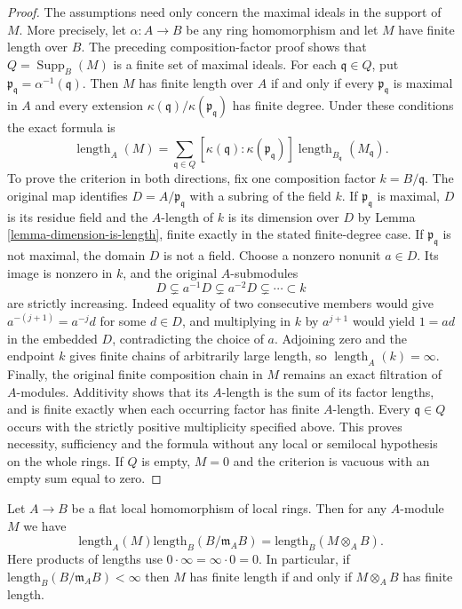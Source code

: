 \begin{proof}
The assumptions need only concern the maximal ideals in the
support of $M$. More precisely, let $\alpha:A\to B$ be any
ring homomorphism and let $M$ have finite length over $B$.
The preceding composition-factor proof shows that
$Q=\operatorname{Supp}_B(M)$ is a finite set of maximal ideals.
For each $\mathfrak q\in Q$, put
$\mathfrak p_{\mathfrak q}=\alpha^{-1}(\mathfrak q)$.
Then $M$ has finite length over $A$ if and only if every
$\mathfrak p_{\mathfrak q}$ is maximal in $A$ and every
extension $\kappa(\mathfrak q)/\kappa(\mathfrak p_{\mathfrak q})$
has finite degree. Under these conditions the exact formula is
$$
\operatorname{length}_A(M)
=\sum_{\mathfrak q\in Q}
[\kappa(\mathfrak q):\kappa(\mathfrak p_{\mathfrak q})]
\operatorname{length}_{B_{\mathfrak q}}(M_{\mathfrak q}).
$$
To prove the criterion in both directions, fix one composition
factor $k=B/\mathfrak q$. The original map identifies
$D=A/\mathfrak p_{\mathfrak q}$ with a subring of the field $k$.
If $\mathfrak p_{\mathfrak q}$ is maximal, $D$ is its residue
field and the $A$-length of $k$ is its dimension over $D$ by
Lemma \ref{lemma-dimension-is-length}, finite exactly in the
stated finite-degree case.
If $\mathfrak p_{\mathfrak q}$ is not maximal, the domain $D$
is not a field. Choose a nonzero nonunit $a\in D$.
Its image is nonzero in $k$, and the original $A$-submodules
$$
D\subsetneq a^{-1}D\subsetneq a^{-2}D\subsetneq\cdots\subset k
$$
are strictly increasing. Indeed equality of two consecutive
members would give $a^{-(j+1)}=a^{-j}d$ for some $d\in D$,
and multiplying in $k$ by $a^{j+1}$ would yield $1=ad$ in
the embedded $D$, contradicting the choice of $a$.
Adjoining zero and the endpoint $k$ gives finite chains of
arbitrarily large length, so $\operatorname{length}_A(k)=\infty$.
Finally, the original finite composition chain in $M$ remains
an exact filtration of $A$-modules. Additivity shows that its
$A$-length is the sum of its factor lengths, and is finite
exactly when each occurring factor has finite $A$-length.
Every $\mathfrak q\in Q$ occurs with the strictly positive
multiplicity specified above. This proves necessity, sufficiency
and the formula without any local or semilocal hypothesis on
the whole rings. If $Q$ is empty, $M=0$ and the criterion is
vacuous with an empty sum equal to zero.
\end{proof}

\begin{lemma}
\label{lemma-pullback-module}
Let $A \to B$ be a flat local homomorphism of local rings.
Then for any $A$-module $M$ we have
$$
\text{length}_A(M) \text{length}_B(B/\mathfrak m_AB)
=
\text{length}_B(M \otimes_A B).
$$
Here products of lengths use $0\cdot\infty=\infty\cdot0=0$.
In particular, if $\text{length}_B(B/\mathfrak m_AB) < \infty$
then $M$ has finite length if and only if $M \otimes_A B$ has finite length.
\end{lemma}

